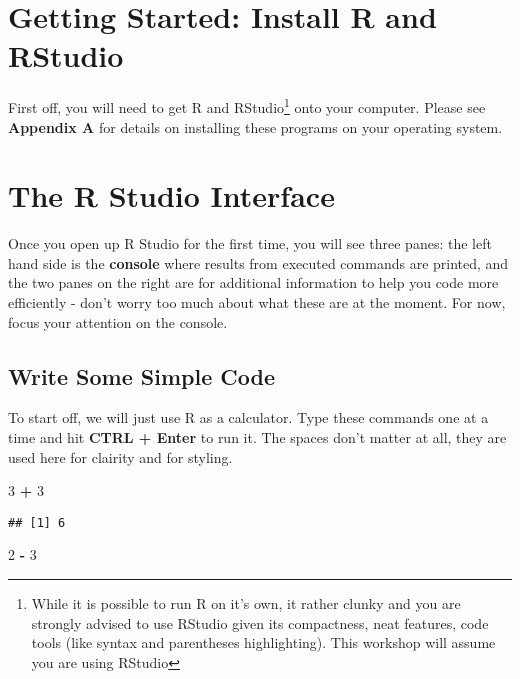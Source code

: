 \documentclass[]{book}
\newenvironment{Shaded}{\begin{snugshade}}{\end{snugshade}}
\newcommand{\DecValTok}[1]{\textcolor[rgb]{0.00,0.00,0.81}{#1}}
\newcommand{\StringTok}[1]{\textcolor[rgb]{0.31,0.60,0.02}{#1}}
\newcommand{\OperatorTok}[1]{\textcolor[rgb]{0.81,0.36,0.00}{\textbf{#1}}}
\let\rmarkdownfootnote\footnote%
\def\footnote{\protect\rmarkdownfootnote}
\theoremstyle{definition}
\theoremstyle{definition}
\theoremstyle{definition}
\theoremstyle{remark}
\begin{document}
\section{Getting Started: Install R and
RStudio}\label{getting-started-install-r-and-rstudio}

First off, you will need to get R and RStudio\footnote{While it is
  possible to run R on it's own, it rather clunky and you are strongly
  advised to use RStudio given its compactness, neat features, code
  tools (like syntax and parentheses highlighting). This workshop will
  assume you are using RStudio} onto your computer. Please see
\textbf{Appendix A} for details on installing these programs on your
operating system.

\section{The R Studio Interface}\label{the-r-studio-interface}

Once you open up R Studio for the first time, you will see three panes:
the left hand side is the \textbf{console} where results from executed
commands are printed, and the two panes on the right are for additional
information to help you code more efficiently - don't worry too much
about what these are at the moment. For now, focus your attention on the
console.

\subsection{Write Some Simple Code}\label{write-some-simple-code}

To start off, we will just use R as a calculator. Type these commands
one at a time and hit \textbf{CTRL + Enter} to run it. The spaces don't
matter at all, they are used here for clairity and for styling.

\begin{Shaded}
\begin{Highlighting}[]
\DecValTok{3} \OperatorTok{+}\StringTok{ }\DecValTok{3}
\end{Highlighting}
\end{Shaded}

\begin{verbatim}
## [1] 6
\end{verbatim}

\begin{Shaded}
\begin{Highlighting}[]
\DecValTok{2} \OperatorTok{-}\StringTok{ }\DecValTok{3}
\end{Highlighting}
\end{Shaded}
\end{document}
